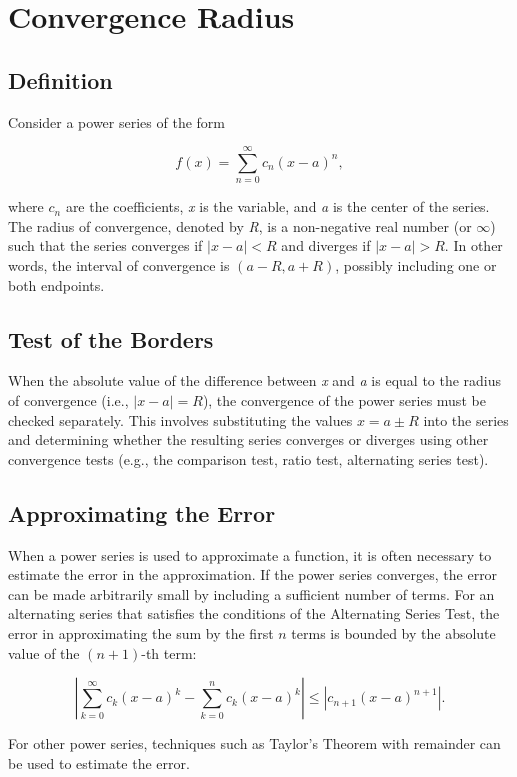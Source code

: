 \newpage
\section{Convergence Radius}

\subsection{Definition}

Consider a power series of the form

\[
    f(x) = \sum_{n=0}^{\infty} c_n {(x - a)}^n,
\]

where \(c_n\) are the coefficients, \emph{x} is the variable, and \emph{a} is the center of the series. The radius of convergence, denoted by \emph{R}, is a non-negative real number (or \(\infty\)) such that the series converges if \(|x - a| < R\) and diverges if \(|x - a| > R\). In other words, the interval of convergence is \((a - R, a + R)\), possibly including one or both endpoints.

\subsection{Test of the Borders}

When the absolute value of the difference between \emph{x} and \emph{a} is equal to the radius of convergence (i.e., \(|x - a| = R\)), the convergence of the power series must be checked separately. This involves substituting the values \(x = a \pm R\) into the series and determining whether the resulting series converges or diverges using other convergence tests (e.g., the comparison test, ratio test, alternating series test).

\subsection{Approximating the Error}

When a power series is used to approximate a function, it is often necessary to estimate the error in the approximation. If the power series converges, the error can be made arbitrarily small by including a sufficient number of terms. For an alternating series that satisfies the conditions of the Alternating Series Test, the error in approximating the sum by the first \(n\) terms is bounded by the absolute value of the \((n+1)\)-th term:

\[
    \left| \sum_{k=0}^{\infty} c_k {(x - a)}^k - \sum_{k=0}^{n} c_k {(x - a)}^k \right| \leq |c_{n+1} {(x - a)}^{n+1}|.
\]

For other power series, techniques such as Taylor's Theorem with remainder can be used to estimate the error.
